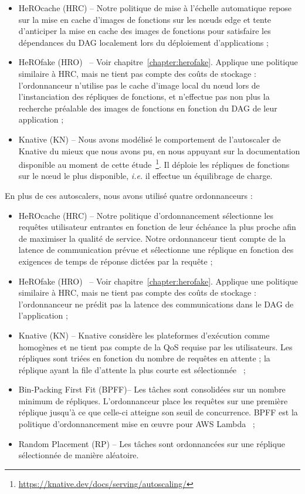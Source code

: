 {\begin{itemize}
    \item HeROcache (HRC) -- Notre politique de mise à l'échelle automatique repose sur la mise en cache d'images de fonctions sur les nœuds edge et tente d'anticiper la mise en cache des images de fonctions pour satisfaire les dépendances du DAG localement lors du déploiement d'applications ;
    \item HeROfake (HRO)~\cite{herofake} -- Voir chapitre~\ref{chapter:herofake}. Applique une politique similaire à HRC, mais ne tient pas compte des coûts de stockage : l'ordonnanceur n'utilise pas le cache d'image local du nœud lors de l'instanciation des répliques de fonctions, et n'effectue pas non plus la recherche préalable des images de fonctions en fonction du DAG de leur application ;
    \item Knative (KN) -- Nous avons modélisé le comportement de l'autoscaler de Knative du mieux que nous avons pu, en nous appuyant sur la documentation disponible au moment de cette étude~\footnote{\href{https://knative.dev/docs/serving/autoscaling/}{https://knative.dev/docs/serving/autoscaling/}}. Il déploie les répliques de fonctions sur le nœud le plus disponible, \textit{i.e.} il effectue un équilibrage de charge.
\end{itemize}

En plus de ces autoscalers, nous avons utilisé quatre ordonnanceurs :

\begin{itemize}
    \item HeROcache (HRC) -- Notre politique d'ordonnancement sélectionne les requêtes utilisateur entrantes en fonction de leur échéance la plus proche afin de maximiser la qualité de service. Notre ordonnanceur tient compte de la latence de communication prévue et sélectionne une réplique en fonction des exigences de temps de réponse dictées par la requête ;
    \item HeROfake (HRO)~\cite{herofake} -- Voir chapitre~\ref{chapter:herofake}. Applique une politique similaire à HRC, mais ne tient pas compte des coûts de stockage : l'ordonnanceur ne prédit pas la latence des communications dans le DAG de l'application ;
    \item Knative (KN) -- Knative considère les plateformes d'exécution comme homogènes et ne tient pas compte de la QoS requise par les utilisateurs. Les répliques sont triées en fonction du nombre de requêtes en attente ; la réplique ayant la file d'attente la plus courte est sélectionnée~\cite{sureshENSUREEfficientScheduling2020} ;
    \item Bin-Packing First Fit (BPFF)-- Les tâches sont consolidées sur un nombre minimum de répliques. L'ordonnanceur place les requêtes sur une première réplique jusqu'à ce que celle-ci atteigne son seuil de concurrence. BPFF est la politique d'ordonnancement mise en œuvre pour AWS Lambda~\cite{wangPeekingCurtainsServerlessb} ;
    \item Random Placement (RP) -- Les tâches sont ordonnancées sur une réplique sélectionnée de manière aléatoire.
\end{itemize}

}
